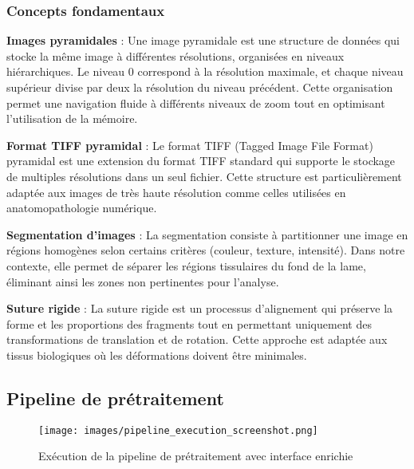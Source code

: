 \documentclass[12pt,a4paper]{report}
\begin{document}
\subsubsection{Concepts fondamentaux}

\textbf{Images pyramidales} : Une image pyramidale est une structure de données qui stocke la même image à différentes résolutions, organisées en niveaux hiérarchiques. Le niveau 0 correspond à la résolution maximale, et chaque niveau supérieur divise par deux la résolution du niveau précédent. Cette organisation permet une navigation fluide à différents niveaux de zoom tout en optimisant l'utilisation de la mémoire.

\textbf{Format TIFF pyramidal} : Le format TIFF (Tagged Image File Format) pyramidal est une extension du format TIFF standard qui supporte le stockage de multiples résolutions dans un seul fichier. Cette structure est particulièrement adaptée aux images de très haute résolution comme celles utilisées en anatomopathologie numérique.

\textbf{Segmentation d'images} : La segmentation consiste à partitionner une image en régions homogènes selon certains critères (couleur, texture, intensité). Dans notre contexte, elle permet de séparer les régions tissulaires du fond de la lame, éliminant ainsi les zones non pertinentes pour l'analyse.

\textbf{Suture rigide} : La suture rigide est un processus d'alignement qui préserve la forme et les proportions des fragments tout en permettant uniquement des transformations de translation et de rotation. Cette approche est adaptée aux tissus biologiques où les déformations doivent être minimales.

\subsection{Pipeline de prétraitement}

\begin{figure}[H]
\centering
\texttt{[image: images/pipeline\_execution\_screenshot.png]}
\caption{Exécution de la pipeline de prétraitement avec interface enrichie}
\label{fig:pipeline_execution}
\end{figure}
\end{document}
